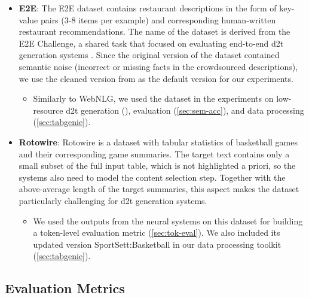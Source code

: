 {\begin{itemize}
    \item \textbf{E2E}: The E2E dataset \cite{dusekEvaluatingStateoftheartEndtoEnd2020,dusekSemanticNoiseMatters2019} contains restaurant descriptions in the form of key-value pairs (3-8 items per example) and corresponding human-written restaurant recommendations. The name of the dataset is derived from the E2E Challenge, a shared task that focused on evaluating end-to-end \ac{d2t} generation systems \cite{dusekEvaluatingStateoftheartEndtoEnd2020}. Since the original version of the dataset contained semantic noise (incorrect or missing facts in the crowdsourced descriptions), we use the cleaned version from \citet{dusekSemanticNoiseMatters2019} as the default version for our experiments.
          \begin{itemize}
              \item
                    Similarly to WebNLG, we used the dataset in the experiments on low-resource \ac{d2t} generation (), evaluation (\autoref{sec:sem-acc}), and data processing (\autoref{sec:tabgenie}).
          \end{itemize}

    \item \textbf{Rotowire}: Rotowire \cite{wiseman2017challenges} is a dataset with tabular statistics of basketball games and their corresponding game summaries. The target text contains only a small subset of the full input table, which is not highlighted a priori, so the systems also need to model the content selection step. Together with the above-average length of the target summaries, this aspect makes the dataset particularly challenging for \ac{d2t} generation systems.
          \begin{itemize}
              \item
                    We used the outputs from the neural systems on this dataset for building a token-level evaluation metric (\autoref{sec:tok-eval}). We also included its updated version SportSett:Basketball \cite{thomson2020sportsett} in our data processing toolkit (\autoref{sec:tabgenie}).
          \end{itemize}
\end{itemize}



\subsection{Evaluation Metrics}
\label{sec:evaluation}

}
